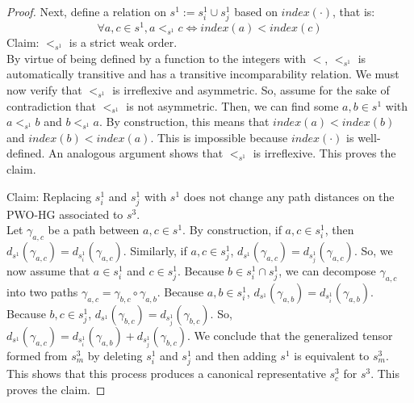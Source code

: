 \documentclass[10pt,a4paper]{amsart}
\begin{document}
\begin{proof}
	Next, define a relation on $s^1 := s^1_i \cup s^1_j$ based on $index(\cdot)$, that is:
	\begin{equation*}
		\forall a, c \in s^1, a <_{s^1} c \iff index(a) < index(c)
	\end{equation*}
	Claim: $<_{s^1}$ is a strict weak order.\\
	By virtue of being defined by a function to the integers with $<$, $<_{s^1}$ is automatically transitive and has a transitive incomparability relation. We must now verify that $<_{s^1}$ is irreflexive and asymmetric. So, assume for the sake of contradiction that $<_{s^1}$ is not asymmetric. Then, we can find some $a, b \in s^1$ with $a <_{s^1} b$ and $b <_{s^1} a$. By construction, this means that $index(a) < index(b)$ and $index(b) < index(a)$. This is impossible because $index(\cdot)$ is well-defined. An analogous argument shows that $<_{s^1}$ is irreflexive. This proves the claim.
	
	Claim: Replacing $s^1_i$ and $s^1_j$ with $s^1$ does not change any path distances on the PWO-HG associated to $s^3$.\\
	Let $\gamma_{a, c}$ be a path between $a, c \in s^1$. By construction, if $a, c \in s^1_i$, then $d_{s^1}(\gamma_{a, c}) = d_{s^1_i}(\gamma_{a, c})$. Similarly, if $a, c \in s^1_j$, $d_{s^1}(\gamma_{a, c}) = d_{s^1_j}(\gamma_{a, c})$. So, we now assume that $a \in s^1_i$ and $c \in s^1_j$. Because $b \in s^1_i \cap s^1_j$, we can decompose $\gamma_{a, c}$ into two paths $\gamma_{a, c} = \gamma_{b, c} \circ \gamma_{a, b}$. Because $a, b \in s^1_i$, $d_{s^1}(\gamma_{a, b}) = d_{s^1_i}(\gamma_{a, b})$. Because $b, c \in s^1_j$, $d_{s^1}(\gamma_{b, c}) = d_{s^1_j}(\gamma_{b, c})$. So, $d_{s^1}(\gamma_{a, c}) = d_{s^1_i}(\gamma_{a, b}) + d_{s^1_j}(\gamma_{b, c})$. We conclude that the generalized tensor formed from $s^3_m$ by deleting $s^1_i$ and $s^1_j$ and then adding $s^1$ is equivalent to $s^3_m$. This shows that this process produces a canonical representative $s^3_c$ for $s^3$. This proves the claim.
	

\end{proof}
\end{document}
